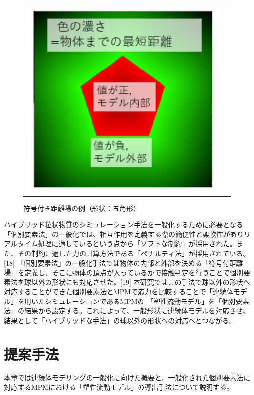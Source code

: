 \documentclass[12pt]{ltjsarticle}
\begin{document}
\begin{figure}[htbp]
\begin{tabular}{cc}
    \begin{minipage}[t]{.5\textwidth}
      \includegraphics*[keepaspectratio, scale=0.3]{sdf.PNG}
      \caption{符号付き距離場の例（形状：五角形）}
    \end{minipage}
  \end{tabular}
\end{figure}

ハイブリッド粒状物質のシミュレーション手法を一般化するために必要となる「個別要素法」の一般化では、相互作用を定義する際の簡便性と柔軟性がありリアルタイム処理に適しているという点から「ソフトな制約」が採用された。また、その制約に適した力の計算方法である「ペナルティ法」が採用されている。[18]
「個別要素法」の一般化手法では物体の内部と外部を決める「符号付距離場」を定義し、そこに物体の頂点が入っているかで接触判定を行うことで個別要素法を球以外の形状にも対応させた。[19]
本研究ではこの手法で球以外の形状へ対応することができた個別要素法とMPMで応力を比較することで「連続体モデル」を用いたシミュレーションであるMPMの
「塑性流動モデル」を「個別要素法」の結果から設定する。これによって、一般形状に連続体モデルを対応させ、結果として「ハイブリッドな手法」の球以外の形状への対応へとつながる。


\newpage

\section{提案手法}
本章では連続体モデリングの一般化に向けた概要と、一般化された個別要素法に対応するMPMにおける「塑性流動モデル」の導出手法について説明する。
\end{document}

